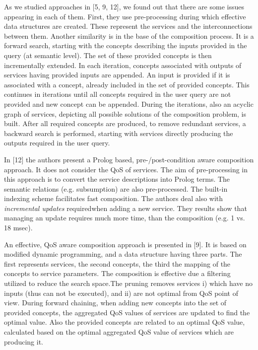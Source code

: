 \documentclass[10pt]{llncs}
\begin{document}
 As we studied approaches in [5, 9, 12], we found out that there are some issues appearing in each of them. First, they use pre-processing during which effective data structures are created. These represent the services and the interconnections between them. Another similarity is in the base of the composition process. It is a forward search, starting with the concepts describing the inputs provided in the query (at semantic level). The set of these provided concepts is then incrementally extended. In each iteration, concepts associated with outputs of services having provided inputs are appended. An input is provided if it is associated with a concept, already included in the set of provided concepts. This continues in iterations until all concepts required in the user query are not provided and new concept can be appended. During the iterations, also an acyclic graph of services, depicting all possible solutions of the composition problem, is built. After all required concepts are produced, to remove redundant services, a backward search is performed, starting with services directly producing the outputs required in the user query. 

In [12] the authors present a Prolog based, pre-/post-condition aware composition approach. It does not consider the QoS of services. The aim of pre-processing in this approach is to convert the service descriptions into Prolog terms. The semantic relations (e.g. subsumption) are also pre-processed. The built-in indexing scheme facilitates fast composition. The authors deal also with \textit{incremental updates} requiredwhen adding a new service. They results show that managing an update requires much more time, than the composition (e.g. 1 vs. 18 msec).

 An effective, QoS aware composition approach is presented in [9]. It is based on modiﬁed dynamic programming, and a data structure having three parts. The ﬁrst represents services, the second concepts, the third the mapping of the concepts to service parameters. The composition is effective due a ﬁltering utilized to reduce the search space.The pruning removes services i) which have no inputs (thus can not be executed), and ii) are not optimal from QoS point of view. During forward chaining, when adding new concepts into the set of provided concepts, the aggregated QoS values of services are updated to ﬁnd the optimal value. Also the provided concepts are related to an optimal QoS value, calculated based on the optimal aggregated QoS value of services which are producing it.
\end{document}
